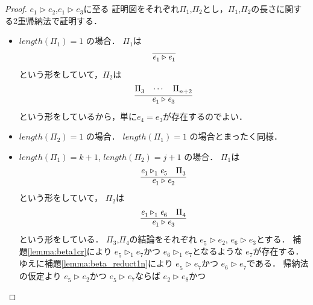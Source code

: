 \documentclass{ltjsbook}%
\newcommand\lemmaname{補題}%
\begin{document}
\begin{proof}%
  $\mathit{e}_1^{}\triangleright\mathit{e}_2^{}$,$\mathit{e}_1^{}\triangleright\mathit{e}_3^{}$に至る%
  証明図をそれぞれ$\Pi_1^{}$,$\Pi_2^{}$とし，$\Pi_1^{}$,$\Pi_2^{}$の長さに関する2重帰納法で証明する．%
  \begin{itemize}%
  \item $length(\Pi_1^{})=1$ の場合．%
    $\Pi_1^{}$は%
    \begin{equation}%
      \infer{%
        \mathit{e}_1^{}\triangleright\mathit{e}_1^{}%
      }{%
      }%
    \end{equation}%
    という形をしていて，$\Pi_2^{}$は%
    \begin{equation}%
      \infer{%
        \mathit{e}_1^{}\triangleright\mathit{e}_3^{}%
      }{%
        \Pi_3^{}&\cdots&\Pi_{n+2}^{}%
      }%
    \end{equation}%
    という形をしているから，単に$\mathit{e}_4^{}=\mathit{e}_3^{}$が存在するのでよい．%
  \item $length(\Pi_2^{})=1$ の場合．%
    $length(\Pi_1^{})=1$ の場合とまったく同様．%
  \item $length(\Pi_1^{})=k+1$, $length(\Pi_2^{})=j+1$ の場合．%
    $\Pi_1^{}$は%
    \begin{equation}%
      \infer{%
        \mathit{e}_1^{}\triangleright\mathit{e}_2^{}%
      }{%
        \mathit{e}_1^{}\triangleright_1^{}\mathit{e}_5^{}%
      &%
        \Pi_3^{}%
      }%
    \end{equation}%
    という形をしていて，%
    $\Pi_2^{}$は%
    \begin{equation}%
      \infer{%
        \mathit{e}_1^{}\triangleright\mathit{e}_3^{}%
      }{%
        \mathit{e}_1^{}\triangleright_1^{}\mathit{e}_6^{}%
      &%
        \Pi_4^{}%
      }%
    \end{equation}%
    という形をしている．%
    $\Pi_3^{}$,$\Pi_4^{}$の結論をそれぞれ%
    $\mathit{e}_5^{}\triangleright\mathit{e}_2^{}$,%
    $\mathit{e}_6^{}\triangleright\mathit{e}_3^{}$とする．%
    \lemmaname\ref{lemma:beta1cr}により%
    $\mathit{e}_5^{}\triangleright_1^{}\mathit{e}_7^{}$かつ%
    $\mathit{e}_6^{}\triangleright_1^{}\mathit{e}_7^{}$となるような%
    $\mathit{e}_7^{}$が存在する．%
    ゆえに\lemmaname\ref{lemma:beta_reduct1n}により%
    $\mathit{e}_5^{}\triangleright\mathit{e}_7^{}$かつ%
    $\mathit{e}_6^{}\triangleright\mathit{e}_7^{}$である．%
    帰納法の仮定より%
    $\mathit{e}_5^{}\triangleright\mathit{e}_2^{}$かつ%
    $\mathit{e}_5^{}\triangleright\mathit{e}_7^{}$ならば%
    $\mathit{e}_2^{}\triangleright\mathit{e}_8^{}$かつ%

\end{itemize}
\end{proof}
\end{document}
